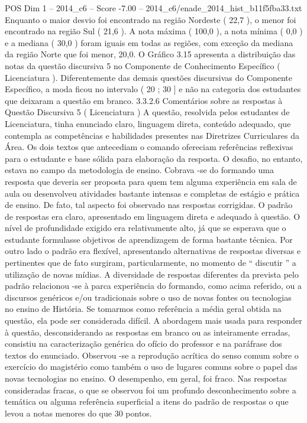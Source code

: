\begin{textsample}{POS Dim 1 – 2014\_c6 – Score -7.00 – 2014\_c6/enade\_2014\_hist\_b11f5fba33.txt}
Enquanto o maior desvio foi encontrado na região Nordeste ( 22,7 ), o menor foi encontrado na região Sul ( 21,6 ).
A nota máxima ( 100,0 ), a nota mínima ( 0,0 ) e a mediana ( 30,0 ) foram iguais em todas as regiões, com exceção da mediana da região Norte que foi menor, 20,0.
O Gráfico 3.15 apresenta a distribuição das notas da questão discursiva 5 no Componente de Conhecimento Específico ( Licenciatura ).
Diferentemente das demais questões discursivas do Componente Específico, a moda ficou no intervalo ( 20 ; 30 ] e não na categoria dos estudantes que deixaram a questão em branco. 3.3.2.6 Comentários sobre as respostas à Questão Discursiva 5 ( Licenciatura ) A questão, resolvida pelos estudantes de Licenciatura, tinha enunciado claro, linguagem direta, conteúdo adequado, que contempla as competências e habilidades presentes nas Diretrizes Curriculares da Área.
Os dois textos que antecediam o comando ofereciam referências reflexivas para o estudante e base sólida para elaboração da resposta.
O desafio, no entanto, estava no campo da metodologia de ensino.
Cobrava -se do formando uma resposta que deveria ser proposta para quem tem alguma experiência em sala de aula ou desenvolveu atividades bastante intensas e completas de estágio e prática de ensino.
De fato, tal aspecto foi observado nas respostas corrigidas.
O padrão de respostas era claro, apresentado em linguagem direta e adequado à questão.
O nível de profundidade exigido era relativamente alto, já que se esperava que o estudante formulasse objetivos de aprendizagem de forma bastante técnica.
Por outro lado o padrão era flexível, apresentando alternativas de respostas diversas e pertinentes que de fato surgiram, particularmente, no momento de “ discutir ” a utilização de novas mídias.
A diversidade de respostas diferentes da prevista pelo padrão relacionou -se à parca experiência do formando, como acima referido, ou a discursos genéricos e/ou tradicionais sobre o uso de novas fontes ou tecnologias no ensino de História.
Se tomarmos como referência a média geral obtida na questão, ela pode ser considerada difícil.
A abordagem mais usada para responder à questão, desconsiderando as respostas em branco ou as inteiramente erradas, consistiu na caracterização genérica do ofício do professor e na paráfrase dos textos do enunciado.
Observou -se a reprodução acrítica do senso comum sobre o exercício do magistério como também o uso de lugares comuns sobre o papel das novas tecnologias no ensino.
O desempenho, em geral, foi fraco.
Nas respostas consideradas fracas, o que se observou foi um profundo desconhecimento sobre a temática ou alguma referência superficial a itens do padrão de respostas o que levou a notas menores do que 30 pontos.

\end{textsample}
